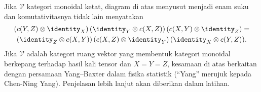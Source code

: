 \begin{remark}\label{rem:YBE-cat-strict}
	Jika $\mathcal{V}$ kategori monoidal ketat, diagram di atas menyusut menjadi enam suku dan komutativitasnya tidak lain menyatakan
	\begin{multline*}
		(c(Y,Z) \otimes \identity_X) \, (\identity_Y \otimes c(X, Z)) \, (c(X, Y) \otimes \identity_Z) = \\
		(\identity_Z \otimes c(X, Y)) \, (c(X, Z) \otimes \identity_Y) \, (\identity_X \otimes c(Y, Z)).
	\end{multline*}
	Jika $\mathcal{V}$ adalah kategori ruang vektor yang membentuk kategori monoidal berkepang terhadap hasil kali tensor dan $X=Y=Z$, kesamaan di atas berkaitan dengan persamaan Yang--Baxter dalam fisika statistik (``Yang'' merujuk kepada Chen-Ning Yang). Penjelasan lebih lanjut akan diberikan dalam latihan.
\end{remark}

